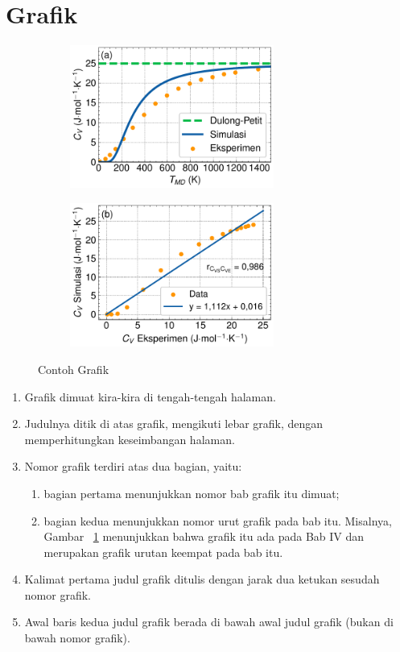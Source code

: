 \section{Grafik}
\begin{figure}[H]
  \begin{subfigure}{.5\textwidth}
    \centering
    \includegraphics[width=6.7cm]{Gambar/cv.pdf}
  \end{subfigure}
  \hspace{0.7em}
  \begin{subfigure}{.5\textwidth}
    \centering
    \includegraphics[width=6.7cm]{Gambar/cv_comp.pdf}
  \end{subfigure}
  \caption{Contoh Grafik}
  \label{fig:cv}
  \end{figure}

\begin{enumerate}
  \item Grafik dimuat kira-kira di tengah-tengah halaman.
  \item Judulnya ditik di atas grafik, mengikuti lebar grafik, dengan memperhitungkan keseimbangan halaman.
  \item Nomor grafik terdiri atas dua bagian, yaitu:
  \begin{enumerate}[label=(\alph*)]
    \item bagian pertama menunjukkan nomor bab grafik itu dimuat; 
    \item bagian kedua menunjukkan nomor urut grafik pada bab itu. Misalnya, Gambar  ~\ref{fig:cv} menunjukkan bahwa grafik itu ada pada Bab IV dan merupakan grafik urutan keempat pada bab itu.
  \end{enumerate}
  \item Kalimat pertama judul grafik ditulis dengan jarak dua ketukan sesudah nomor grafik.
  \item Awal baris kedua judul grafik berada di bawah awal judul grafik (bukan di bawah nomor grafik).
\end{enumerate}

